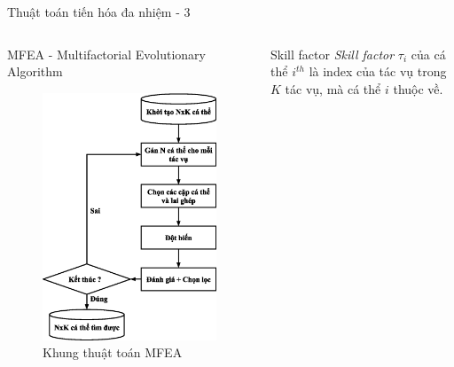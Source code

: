\begin{frame}{Thuật toán tiến hóa đa nhiệm - 3}
    \begin{columns}
        \begin{column}{0.45\textwidth}
            \begin{block}{MFEA - Multifactorial Evolutionary Algorithm}
                \begin{figure}
                    \centering
                    \includegraphics[width=0.7\linewidth]{figure/preliminary/mfea.eps}
                    \caption{Khung thuật toán MFEA}
                    \label{fig:preliminary:mfea}
                \end{figure}
            \end{block}
        \end{column}
        \begin{column}{0.45\textwidth}
            \begin{alertblock}{Skill factor}
                \fontsize{6pt}{10}\selectfont
                \emph{Skill factor} $\tau_i$ của cá thể $i^{th}$ là index của tác vụ trong $K$ tác vụ, mà cá thể $i$ thuộc về.
            \end{alertblock}
            \begin{algorithm}[H]
                \fontsize{6pt}{10}\selectfont
                \caption{\fontsize{6pt}{10}\selectfont Lai ghép trong MFEA}

\end{algorithm}
\end{column}
\end{columns}
\end{frame}
